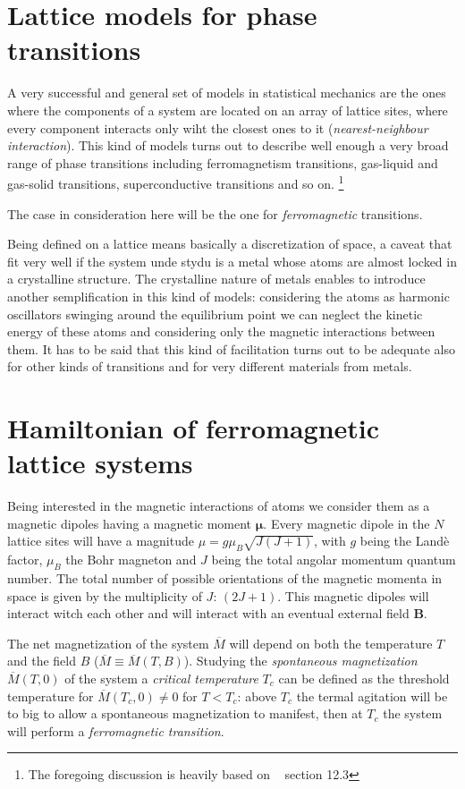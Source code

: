 \section{Lattice models for phase transitions}

A very successful and general set of models in statistical mechanics are the
ones where the components of a system are located on an array of lattice sites,
where every component interacts only wiht the closest ones to it 
(\emph{nearest-neighbour interaction}).
This kind of models turns out to describe well enough a very broad range of phase 
transitions including ferromagnetism transitions, gas-liquid and gas-solid 
transitions, superconductive transitions and so on. \footnote{The foregoing
discussion is heavily based on ~\textcite{pathria1972statistical} section 12.3}

The case in consideration here will be the one for \emph{ferromagnetic}
transitions.

Being defined on a lattice means basically a discretization of space, a caveat 
that fit very well if the system unde stydu is a metal whose atoms are almost 
locked in a crystalline structure. The crystalline nature of metals enables to
introduce another semplification in this kind of models: considering the atoms
as harmonic oscillators swinging around the equilibrium point we can neglect the
kinetic energy of these atoms and considering only the magnetic interactions
between them. It has to be said that this kind of facilitation turns out to be 
adequate also for other kinds of transitions and for very different materials
from metals.

\section{Hamiltonian of ferromagnetic lattice systems}

Being interested in the magnetic interactions of atoms we consider them as a 
magnetic dipoles having a magnetic moment $\mathbf{\mu}$. Every magnetic dipole
in the $N$ lattice sites will have a magnitude $\mu = g \mu_B \sqrt{J(J+1)}$, 
with $g$ being the Landè factor, $\mu_B$ the Bohr magneton and $J$ being the
total angolar momentum quantum number. The total number of possible orientations of
the magnetic momenta in space is given by the multiplicity of $J$: $(2J+1)$. This 
magnetic dipoles will interact witch each other and will interact with an eventual
external field $\mathbf{B}$.

The net magnetization of the system $\overline{M}$ will depend on both the 
temperature $T$ and the field $B$ ($\overline{M} \equiv \overline{M}(T,B)$). 
Studying the \emph{spontaneous magnetization} $\overline{M}(T,0)$ of the system
a \emph{critical temperature} $T_c$ can be defined as the threshold temperature
for $\overline{M}(T_c,0) \neq 0$ for $T < T_c$: above $T_c$ the termal agitation 
will be to big to allow a spontaneous magnetization to manifest, then at $T_c$ the
system will perform a \emph{ferromagnetic transition}.

